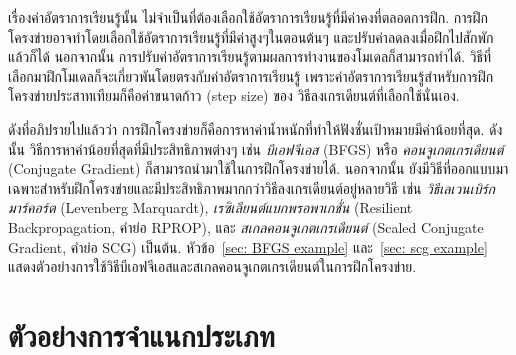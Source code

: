 เรื่องค่าอัตราการเรียนรู้นั้น ไม่จำเป็นที่ต้องเลือกใช้อัตราการเรียนรู้ที่มีค่าคงที่ตลอดการฝึก.
การฝึกโครงข่ายอาจทำโดยเลือกใช้อัตราการเรียนรู้ที่มีค่าสูงๆในตอนต้นๆ และปรับค่าลดลงเมื่อฝึกไปสักพักแล้วก็ได้
นอกจากนั้น การปรับค่าอัตราการเรียนรู้ตามผลการทำงานของโมเดลก็สามารถทำได้.
วิธีที่เลือกมาฝึกโมเดลก็จะเกี่ยวพันโดยตรงกับค่าอัตราการเรียนรู้ เพราะค่าอัตราการเรียนรู้สำหรับการฝึกโครงข่ายประสาทเทียมก็คือค่าขนาดก้าว (step size) ของ วิธีลงเกรเดียนต์ที่เลือกใช้นั่นเอง.

ดังที่อภิปรายไปแล้วว่า การฝึกโครงข่ายก็คือการหาค่าน้ำหนักที่ทำให้ฟังชั่นเป้าหมายมีค่าน้อยที่สุด.
ดังนั้น วิธีการหาค่าน้อยที่สุดที่มีประสิทธิภาพต่างๆ เช่น \textit{บีเอฟจีเอส} (BFGS) หรือ \textit{คอนจูเกตเกรเดียนต์} (Conjugate Gradient) ก็สามารถนำมาใช้ในการฝึกโครงข่ายได้.
นอกจากนั้น ยังมีวิธีที่ออกแบบมาเฉพาะสำหรับฝึกโครงข่ายและมีประสิทธิภาพมากกว่าวิธีลงเกรเดียนต์อยู่หลายวิธี เช่น 
\textit{วิธีเลเวนเบิร์กมาร์คอร์ต} (Levenberg Marquardt\cite{HaganMenhaj1994a}), \textit{เรซิเลียนต์แบกพรอพาเกชั่น} (Resilient Backpropagation, คำย่อ RPROP\cite{RiedmillerBraun1993a}), และ \textit{สเกลคอนจูเกตเกรเดียนต์} (Scaled Conjugate Gradient, คำย่อ SCG\cite{Moller1993a}) เป็นต้น.
หัวข้อ~\ref{sec: BFGS example} และ~\ref{sec: scg example} แสดงตัวอย่างการใช้วิธีบีเอฟจีเอสและสเกลคอนจูเกตเกรเดียนต์ในการฝึกโครงข่าย.

\section{ตัวอย่างการจำแนกประเภท}
\label{sec: ann biclass example}


